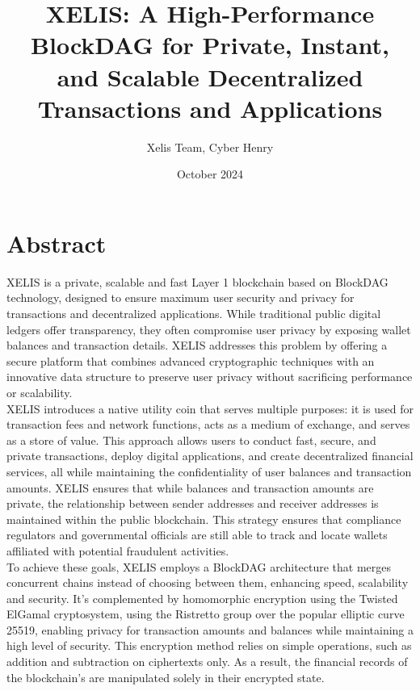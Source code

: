 \documentclass[12pt,a4paper,twocolumn]{article}
\title{XELIS: A High-Performance BlockDAG for Private, Instant, and Scalable Decentralized Transactions and Applications}
\author{Xelis Team, Cyber Henry}
\date{October 2024}
\begin{document}
\maketitle

\section{Abstract}


XELIS is a private, scalable and fast Layer 1 blockchain based on BlockDAG technology, designed to ensure maximum user security and privacy for transactions and decentralized applications. While traditional public digital ledgers offer transparency, they often compromise user privacy by exposing wallet balances and transaction details. XELIS addresses this problem by offering a secure platform that combines advanced cryptographic techniques with an innovative data structure to preserve user privacy without sacrificing performance or scalability.\\

XELIS introduces a native utility coin that serves multiple purposes: it is used for transaction fees and network functions, acts as a medium of exchange, and serves as a store of value. This approach allows users to conduct fast, secure, and private transactions, deploy digital applications, and create decentralized financial services, all while maintaining the confidentiality of user balances and transaction amounts. XELIS ensures that while balances and transaction amounts are private, the relationship between sender addresses and receiver addresses is maintained within the public blockchain. This strategy ensures that compliance regulators and governmental officials are still able to track and locate wallets affiliated with potential fraudulent activities.\\

To achieve these goals, XELIS employs a BlockDAG architecture that merges concurrent chains instead of choosing between them, enhancing speed, scalability and security. It's complemented by homomorphic encryption using the Twisted ElGamal cryptosystem, using the Ristretto group over the popular elliptic curve 25519, enabling privacy for transaction amounts and balances while maintaining a high level of security. This encryption method relies on simple operations, such as addition and subtraction on ciphertexts only. As a result, the financial records of the blockchain's are manipulated solely in their encrypted state.\\
\end{document}
